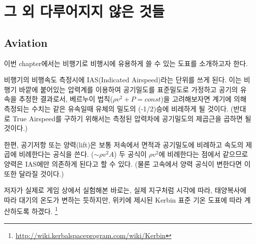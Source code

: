 \documentclass[9pt]{amsbook}
\begin{document}
\part{그 외 다루어지지 않은 것들}
\chapter{Aviation}
이번 chapter에서는 비행기로 비행시에 유용하게 쓸 수 있는 도표를 소개하고자 한다.

비행기의 비행속도 측정시에 IAS(Indicated Airspeed)라는 단위를 쓰게 된다. 
이는 비행기 바깥에 붙어있는 압력계를 이용하여 공기밀도를 표준밀도로 가정하고 공기의 유속을 추정한 결과로서, 베르누이 법칙($\rho v^2 + P = const$)을 고려해보자면 계기에 의해 측정되는 수치는 같은 유속일때 유체의 밀도의 (-1/2)승에 비레하게 될 것이다. (반대로 True Airspeed를 구하기 위해서는 측정된 압력차에 공기밀도의 제곱근을 곱하면 될 것이다.)

한편, 공기저항 또는 양력(lift)은 보통 저속에서 면적과 공기밀도에 비례하고 속도의 제곱에 비례한다는 공식을 쓴다. ($\sim \rho v^2 A$)
두 공식이 $\rho v^2$에 비례한다는 점에서 같으므로 양력은 IAS에만 의존하게 된다고 할 수 있다. (물론 고속에서 양력 공식이 변한다면 이 또한 달라질 것이다.)

저자가 실제로 게임 상에서 실험해본 바로는, 실제 지구처럼 시각에 따라, 태양복사에 따라 대기의 온도가 변하는 듯하지만, 위키에 제시된 Kerbin 표준 기온 도표에 따라 계산하도록 하겠다. \footnote{\url{http://wiki.kerbalspaceprogram.com/wiki/Kerbin}}
\end{document}
